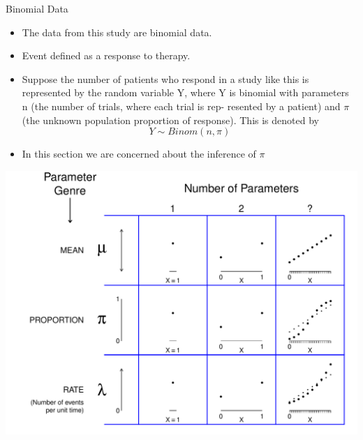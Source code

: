 \documentclass[10pt]{beamer}\usepackage[]{graphicx}\usepackage[]{color}
\makeatletter
\def\maxwidth{ %
  \ifdim\Gin@nat@width>\linewidth
    \linewidth
  \else
    \Gin@nat@width
  \fi
}
\newenvironment{knitrout}{}{} %
\makeatother
\begin{document}
\begin{frame}{Binomial Data}
\begin{itemize}
	\item The data from this study are binomial data. 
	\item Event defined as a response to therapy.
	\item Suppose the number of patients who respond in a study like this is represented by the random
	variable Y, where Y is binomial with parameters n (the number of trials, where each trial is rep-
	resented by a patient) and $\pi$ (the unknown population proportion of response). This is denoted by $$Y\sim Binom(n,\pi)$$
	\item In this section we are concerned about the inference of $\pi$
\end{itemize}
\end{frame}



\begin{frame}
\begin{knitrout}\tiny
{}\color{fgcolor}

{\centering \includegraphics[width=\maxwidth]{figure/unnamed-chunk-1-1} 

}



\end{knitrout}
\end{frame}
\end{document}
